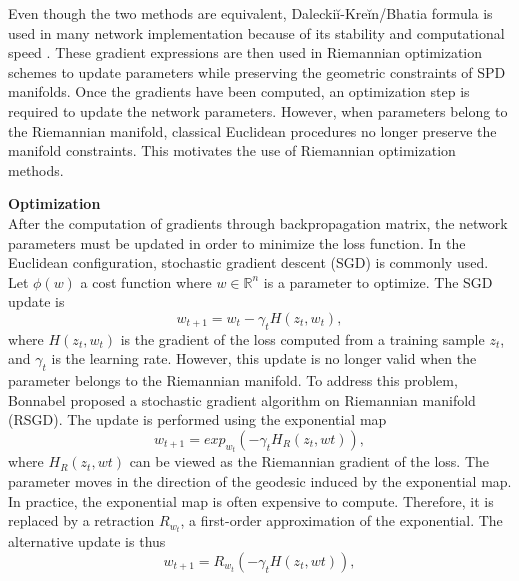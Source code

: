 \documentclass[11pt,a4paper]{article}
\begin{document}
Even though the two methods are equivalent, Daleckiĭ-Kreĭn/Bhatia formula is used in many network implementation because of its stability and computational speed \cite{backprop}.
These gradient expressions are then used in Riemannian optimization schemes to update parameters while preserving the geometric constraints of SPD manifolds. Once the gradients have been computed, an optimization step is required to update the network parameters. However, when parameters belong to the Riemannian manifold, classical Euclidean procedures no longer preserve the manifold constraints. This motivates the use of Riemannian optimization methods. \\
\newline

\noindent \textbf{Optimization} \\
After the computation of gradients through backpropagation matrix, the network parameters must be updated in order to minimize the loss function. In the Euclidean configuration, stochastic gradient descent (SGD) is commonly used. 
Let $\phi(w)$ a cost function where $w \in \mathbb{R}^n$ is a parameter to optimize. The SGD update is \[ w_{t+1} = w_t - \gamma_t H(z_t , w_t),\] where $H(z_t, w_t)$ is the gradient of the loss computed from a training sample $z_t$, and $\gamma_t$ is the learning rate. However, this update is no longer valid when the parameter belongs to the Riemannian manifold. To address this problem, Bonnabel \cite{SGD} proposed a stochastic gradient algorithm on Riemannian manifold (RSGD). The update is performed using the exponential map \[ w_{t+1} = exp_{w_t}(-\gamma_t H_R(z_t , wt)),\] where $H_R(z_t , wt)$ can be viewed as the Riemannian gradient of the loss. 
The parameter moves in the direction of the geodesic induced by the exponential map. \\ 

\noindent In practice, the exponential map is often expensive to compute. Therefore, it is replaced by a retraction $R_{w_t}$, a first-order approximation of the exponential. The alternative update is thus  \[ w_{t+1} = R_{w_t}(- \gamma_t H(z_t , wt)),\]
\end{document}

